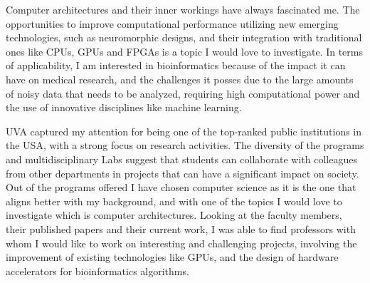 \begin{cvletter}




Computer architectures and their inner workings have always fascinated me. The opportunities to improve computational performance utilizing new emerging technologies, such as neuromorphic designs, and their integration with traditional ones like CPUs, GPUs and FPGAs is a topic I would love to investigate.
In terms of applicability, I am interested in bioinformatics because of the impact it can have on medical research, and the challenges it posses due to the large amounts of noisy data that needs to be analyzed, requiring high computational power and the use of innovative disciplines like machine learning.







UVA captured my attention for being one of the top-ranked public institutions in the USA, with a strong focus on research activities. The diversity of the programs and multidisciplinary Labs suggest that students can collaborate with colleagues from other departments in projects that can have a significant impact on society. Out of the programs offered I have chosen computer science as it is the one that aligns better with my background, and with one of the topics I would love to investigate which is computer architectures. Looking at the faculty members, their published papers and their current work, I was able to find professors with whom I would like to work on interesting and challenging projects, involving the improvement of existing technologies like GPUs, and the design of hardware accelerators for bioinformatics algorithms.



\end{cvletter}


\makeletterclosing



